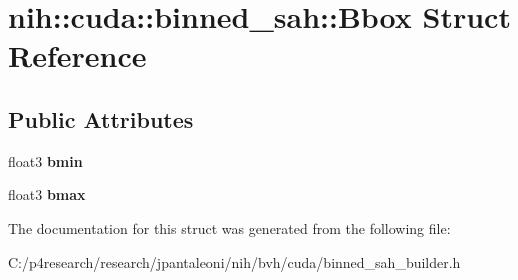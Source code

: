 \hypertarget{structnih_1_1cuda_1_1binned__sah_1_1_bbox}{
\section{nih\-:\-:cuda\-:\-:binned\-\_\-sah\-:\-:\-Bbox \-Struct \-Reference}
\label{structnih_1_1cuda_1_1binned__sah_1_1_bbox}
}
\subsection*{\-Public \-Attributes}
\begin{DoxyCompactItemize}
\item 
\hypertarget{structnih_1_1cuda_1_1binned__sah_1_1_bbox_abc6191921ae103f2af41df5f1d275f7f}{
float3 {\bfseries bmin}}
\label{structnih_1_1cuda_1_1binned__sah_1_1_bbox_abc6191921ae103f2af41df5f1d275f7f}

\item 
\hypertarget{structnih_1_1cuda_1_1binned__sah_1_1_bbox_a61cad126c5a007ba5c1f17ea525dee10}{
float3 {\bfseries bmax}}
\label{structnih_1_1cuda_1_1binned__sah_1_1_bbox_a61cad126c5a007ba5c1f17ea525dee10}

\end{DoxyCompactItemize}


\-The documentation for this struct was generated from the following file\-:\begin{DoxyCompactItemize}
\item 
\-C\-:/p4research/research/jpantaleoni/nih/bvh/cuda/binned\-\_\-sah\-\_\-builder.\-h\end{DoxyCompactItemize}
